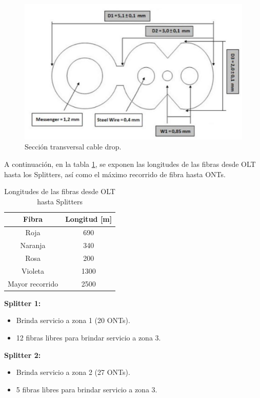 \documentclass[12pt,a4paper]{book}
\begin{document}
\begin{figure} [H]
\centering
\includegraphics[width = 10 cm]{../figuras/Seccion_cable_drop.jpg}
\caption{Sección transversal cable drop.}
\label{fig_SeccionCableDrop}
\end{figure}

\medskip

A continuación, en la tabla \ref{Tabla_distanciasOLT-ONT}, se exponen las longitudes de las fibras desde
OLT hasta los Splitters, así como el máximo recorrido de fibra hasta ONTs.

\medskip

\begin{table} [H]
\centering
\begin{tabular}{|c|c|}
\hline 
\textbf{Fibra} & \textbf{Longitud [m]} \\ 
\hline 
Roja & 690 \\ 
\hline 
Naranja & 340 \\ 
\hline 
Rosa & 200 \\ 
\hline 
Violeta & 1300 \\ 
\hline 
Mayor recorrido & 2500 \\ 
\hline 
\end{tabular} 
\caption{Longitudes de las fibras desde OLT hasta Splitters}
\label{Tabla_distanciasOLT-ONT}
\end{table}

\medskip

\noindent \textbf{Splitter 1:}
\begin{itemize}
\item Brinda servicio a zona 1 (20 ONTs).
\item 12 fibras libres para brindar servicio a zona 3.
\end{itemize}

\noindent \textbf{Splitter 2:}
\begin{itemize}
\item Brinda servicio a zona 2 (27 ONTs).
\item 5 fibras libres para brindar servicio a zona 3.
\end{itemize}
\end{document}
